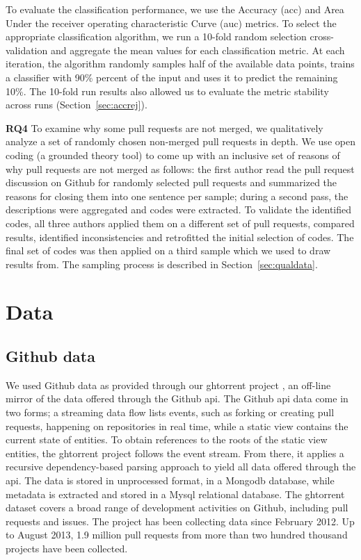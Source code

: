 \documentclass{sig-alternate}
\begin{document}
To evaluate the classification performance, we use the Accuracy ({\sc acc}) and
Area Under the receiver operating characteristic Curve ({\sc auc}) metrics. To
select the appropriate classification algorithm, we run a 10-fold random
selection cross-validation and aggregate the mean values for each classification
metric. At each iteration, the algorithm randomly samples half of the
available data points, trains a classifier with 90\% percent of the input and
uses it to predict the remaining 10\%. The 10-fold run results also allowed us to
evaluate the metric stability across runs (Section~\ref{sec:accrej}).

{\bfseries RQ4} To examine why some pull requests are not merged, we
qualitatively analyze a set of randomly chosen non-merged pull requests in
depth. We use open coding (a grounded theory tool) to come up with an inclusive
set of reasons of why pull requests are not merged as follows: the first author
read the pull request discussion on Github for randomly selected pull requests
and summarized the reasons for closing them into one sentence per sample; during
a second pass, the descriptions were aggregated and codes were extracted. To
validate the identified codes, all three authors applied them on a different set
of pull requests, compared results, identified inconsistencies and retrofitted
the initial selection of codes. The final set of codes was then applied on a
third sample which we used to draw results from. The sampling process
is described in Section~\ref{sec:qualdata}.

\section{Data}

\subsection{Github data}
\label{sec:ghtorrent}

We used Github data as provided through our {\sc ght}orrent project \cite{G13},
an off-line mirror of the data
offered through the Github {\sc api}. The Github {\sc api} 
data come in two forms; a streaming
data flow lists events, such as forking or creating pull requests, happening on
repositories in real time, while a static view contains the current state of
entities. To obtain references to the roots of the static view entities, the
{\sc ght}orrent project follows the event stream. From there, it applies a
recursive dependency-based parsing approach to yield all data offered through
the {\sc api}. The data is stored in unprocessed format, in a Mongo{\sc db}
database, while metadata is extracted and stored in a My{\sc sql} relational
database. The {\sc ght}orrent dataset covers a broad range of development
activities on Github, including pull requests and issues. The project
has been collecting data since February 2012. Up to August 2013,
1.9 million pull requests from more than two hundred thousand projects
have been collected.
\end{document}
